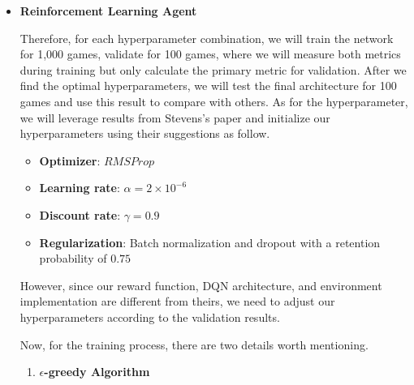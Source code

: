 \documentclass[letterpaper]{article} %
\begin{document}
\begin{itemize}
  

  \item \textbf{Reinforcement Learning Agent} 
  
  Therefore, for each hyperparameter combination, we will train the network for 1,000 games, validate for 100 games, where we will measure both metrics during training but only calculate the primary metric for validation. After we find the optimal hyperparameters, we will test the final architecture for 100 games and use this result to compare with others. As for the hyperparameter, we will leverage results from Stevens's paper \cite{Stevens_2016} and initialize our hyperparameters using their suggestions as follow. 
  
  \begin{itemize}
    \item {\bf Optimizer}: $RMSProp$
    \item {\bf Learning rate}: $\alpha = 2\times 10^{-6}$
    \item {\bf Discount rate}: $\gamma = 0.9$
    \item {\bf Regularization}: Batch normalization and dropout with a retention probability of $0.75$
  \end{itemize}

  However, since our reward function, DQN architecture, and environment implementation are different from theirs, we need to adjust our hyperparameters according to the validation results.

  Now, for the training process, there are two details worth mentioning.
  \begin{enumerate}
    \item {\bf $\epsilon$-greedy Algorithm}
    

\end{enumerate}
\end{itemize}
\end{document}
